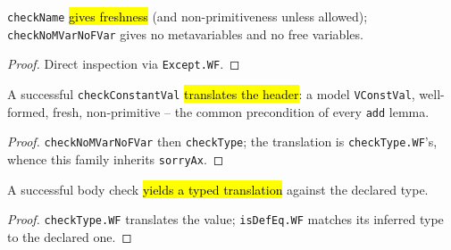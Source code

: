 \begin{lemma}
\label{family:check-name}
\leanok
{}

 \texttt{checkName} \hl{gives freshness} (and non-primitiveness unless
allowed); \texttt{checkNoMVarNoFVar} gives no metavariables and no free variables.
\end{lemma}
\begin{proof}
\leanok
{} Direct inspection via \texttt{Except.WF}.
\end{proof}

\begin{lemma}
\label{family:check-constant-val}
\leanok
{}

 A successful \texttt{checkConstantVal} \hl{translates the header}: a model
\texttt{VConstVal}, well-formed, fresh, non-primitive -- the common precondition of every
\texttt{add} lemma.
\end{lemma}
\begin{proof}
\leanok
{} \texttt{checkNoMVarNoFVar} then \texttt{checkType}; the translation is
\texttt{checkType.WF}'s, whence this family inherits \texttt{sorryAx}.
\end{proof}

\begin{lemma}
\label{family:check-body}
\leanok
{}

 A successful body check \hl{yields a typed translation} against the
declared type.
\end{lemma}
\begin{proof}
\leanok
{} \texttt{checkType.WF} translates the value; \texttt{isDefEq.WF} matches its
inferred type to the declared one.
\end{proof}

